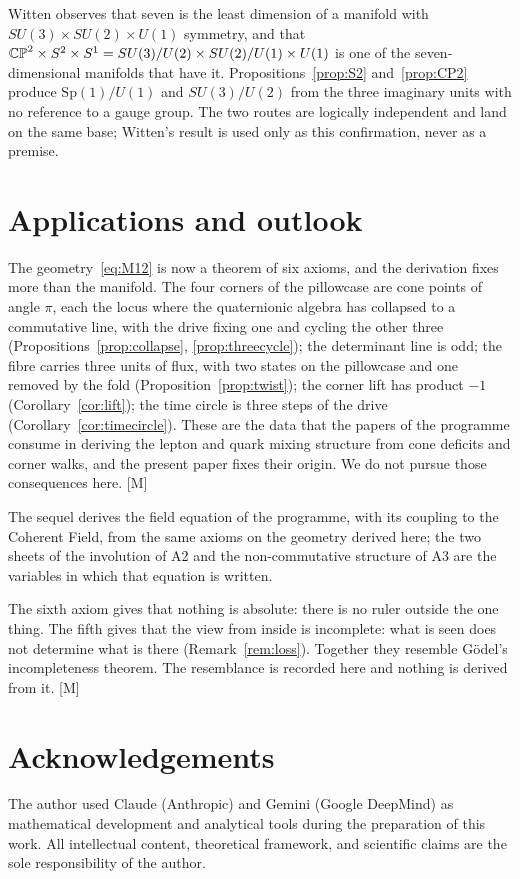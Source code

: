 \documentclass[11pt,a4paper]{article}
\theoremstyle{plain}
\theoremstyle{definition}
\theoremstyle{remark}
\newcommand{\rigM}{[\textup{M}]}
\begin{document}
Witten \cite{Witten1981} observes that seven is the least dimension of a manifold with $SU(3)\times SU(2)\times U(1)$ symmetry, and that $\mathbb{CP}^2\times S^2\times S^{1}=SU(3)/U(2)\times SU(2)/U(1)\times U(1)$ is one of the seven-dimensional manifolds that have it. Propositions~\ref{prop:S2} and~\ref{prop:CP2} produce $\mathrm{Sp}(1)/U(1)$ and $SU(3)/U(2)$ from the three imaginary units with no reference to a gauge group. The two routes are logically independent and land on the same base; Witten's result is used only as this confirmation, never as a premise.

\section{Applications and outlook}\label{sec:outlook}

The geometry~\eqref{eq:M12} is now a theorem of six axioms, and the derivation fixes more than the manifold. The four corners of the pillowcase are cone points of angle $\pi$, each the locus where the quaternionic algebra has collapsed to a commutative line, with the drive fixing one and cycling the other three (Propositions~\ref{prop:collapse}, \ref{prop:threecycle}); the determinant line is odd; the fibre carries three units of flux, with two states on the pillowcase and one removed by the fold (Proposition~\ref{prop:twist}); the corner lift has product $-1$ (Corollary~\ref{cor:lift}); the time circle is three steps of the drive (Corollary~\ref{cor:timecircle}). These are the data that the papers of the programme consume in deriving the lepton and quark mixing structure from cone deficits and corner walks, and the present paper fixes their origin. We do not pursue those consequences here. \rigM

The sequel derives the field equation of the programme, with its coupling to the Coherent Field, from the same axioms on the geometry derived here; the two sheets of the involution of A2 and the non-commutative structure of A3 are the variables in which that equation is written.

The sixth axiom gives that nothing is absolute: there is no ruler outside the one thing. The fifth gives that the view from inside is incomplete: what is seen does not determine what is there (Remark~\ref{rem:loss}). Together they resemble G\"odel's incompleteness theorem. The resemblance is recorded here and nothing is derived from it. \rigM

\section*{Acknowledgements}
The author used Claude (Anthropic) and Gemini (Google DeepMind) as mathematical development and analytical tools during the preparation of this work. All intellectual content, theoretical framework, and scientific claims are the sole responsibility of the author.
\end{document}
